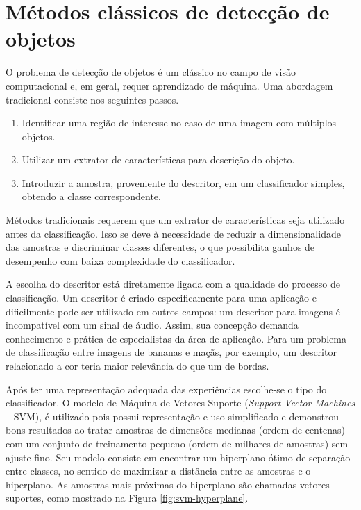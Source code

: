 \section{Métodos clássicos de detecção de objetos}
O problema de detecção de objetos é um clássico no campo de visão computacional e, em geral, requer aprendizado de máquina. Uma abordagem tradicional \cite{traditional-objdetect} consiste nos seguintes passos.
	\begin{enumerate}
	\item Identificar uma região de interesse no caso de uma imagem com múltiplos objetos.
	\item Utilizar um extrator de características para descrição do objeto.
	\item Introduzir a amostra, proveniente do descritor, em um classificador simples, obtendo a classe correspondente.
	\end{enumerate}

Métodos tradicionais requerem que um extrator de características seja utilizado antes da classificação. Isso se deve à necessidade de reduzir a dimensionalidade das amostras e discriminar classes diferentes, o que possibilita ganhos de desempenho com baixa complexidade do classificador.

A escolha do descritor está diretamente ligada com a qualidade do processo de classificação. Um descritor é criado especificamente para uma aplicação e dificilmente pode ser utilizado em outros campos: um descritor para imagens é incompatível com um sinal de áudio. Assim, sua concepção demanda conhecimento e prática de especialistas da área de aplicação. Para um problema de classificação entre imagens de bananas e maçãs, por exemplo, um descritor relacionado a cor teria maior relevância do que um de bordas.

Após ter uma representação adequada das experiências escolhe-se o tipo do classificador. O modelo de Máquina de Vetores Suporte (\textit{Support Vector Machines} -- SVM), é utilizado pois possui representação e uso simplificado e demonstrou bons resultados \cite{smith2001svm} ao tratar amostras de dimensões medianas (ordem de centenas) com um conjunto de treinamento pequeno (ordem de milhares de amostras) sem ajuste fino. Seu modelo consiste em encontrar um hiperplano ótimo de separação entre classes, no sentido de maximizar a distância entre as amostras e o hiperplano. As amostras mais próximas do hiperplano são chamadas vetores suportes, como mostrado na Figura \ref{fig:svm-hyperplane}.


